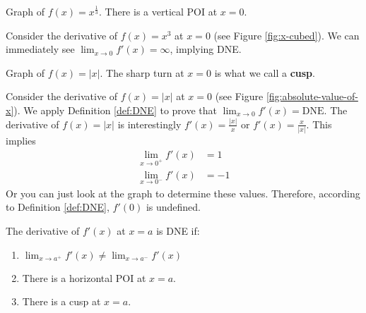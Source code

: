 \documentclass[working]{tuftebook}
\begin{document}
\begin{marginfigure}
    \centering
    \caption{Graph of $f(x)=x^ \frac{1}{3}$. There is a vertical POI at $x=0$.}
    \label{fig:x-cubed}
\end{marginfigure}

\begin{eg}
    Consider the derivative of $f(x)=x^3$ at $x=0$ (see Figure \ref{fig:x-cubed}). We can immediately see $\displaystyle \lim_{x\to 0}f'(x)=\infty$, implying DNE. 
\end{eg}

\begin{marginfigure}
    \centering
    \caption{Graph of $f(x)= |x|$. The sharp turn at $x=0$ is what we call a \textbf{cusp}.}
    \label{fig:absolute-value-of-x}
\end{marginfigure}

\begin{eg}
    Consider the derivative of $f(x)=|x|$ at $x=0$ (see Figure \ref{fig:absolute-value-of-x}). We apply Definition \ref{def:DNE} to prove that $\displaystyle \lim_{x\to 0}f'(x)= \text{DNE}$. The derivative of $f(x)=|x|$ is interestingly $f'(x)= \frac{|x|}{x}$ or $f'(x)= \frac{x}{|x|}$. This implies
    \begin{align*}
        \lim_{x\to 0^+}f'(x)&=1\\
        \lim_{x\to 0^-}f'(x)&=-1
    \end{align*}
    Or you can just look at the graph to determine these values. Therefore, according to Definition \ref{def:DNE}, $f'(0)$ is undefined. 
\end{eg}

\begin{proposition}
    The derivative of $f'(x)$ at $x=a$ is DNE if: 
    \begin{enumerate}
    \setlength\itemsep{0.5em}
        \item{ $\displaystyle \lim_{x\to a^+}f'(x)\neq \lim_{x\to a^-}f'(x)$}
        \item{There is a horizontal POI at $x=a$.}
        \item{There is a cusp at $x=a$.}
    \end{enumerate}
\end{proposition}
\end{document}
